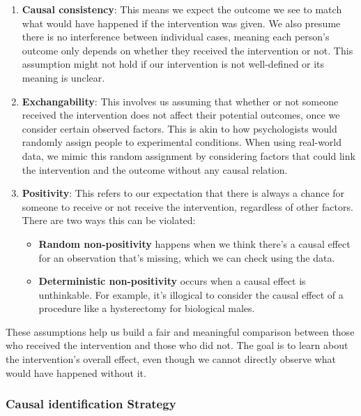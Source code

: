 \documentclass[
  singlecolumn,
  9pt]{scrartcl}
\begin{document}
\begin{enumerate}
\def\labelenumi{\arabic{enumi}.}
\item
  \textbf{Causal consistency}: This means we expect the outcome we see
  to match what would have happened if the intervention was given. We
  also presume there is no interference between individual cases,
  meaning each person's outcome only depends on whether they received
  the intervention or not. This assumption might not hold if our
  intervention is not well-defined or its meaning is unclear.
\item
  \textbf{Exchangability}: This involves us assuming that whether or not
  someone received the intervention does not affect their potential
  outcomes, once we consider certain observed factors. This is akin to
  how psychologists would randomly assign people to experimental
  conditions. When using real-world data, we mimic this random
  assignment by considering factors that could link the intervention and
  the outcome without any causal relation.
\item
  \textbf{Positivity}: This refers to our expectation that there is
  always a chance for someone to receive or not receive the
  intervention, regardless of other factors. There are two ways this can
  be violated:

  \begin{itemize}
  \item
    \textbf{Random non-positivity} happens when we think there's a
    causal effect for an observation that's missing, which we can check
    using the data.
  \item
    \textbf{Deterministic non-positivity} occurs when a causal effect is
    unthinkable. For example, it's illogical to consider the causal
    effect of a procedure like a hysterectomy for biological males.
  \end{itemize}
\end{enumerate}

These assumptions help us build a fair and meaningful comparison between
those who received the intervention and those who did not. The goal is
to learn about the intervention's overall effect, even though we cannot
directly observe what would have happened without it.

\subsubsection{Causal identification
Strategy}\label{causal-identification-strategy}
\end{document}
